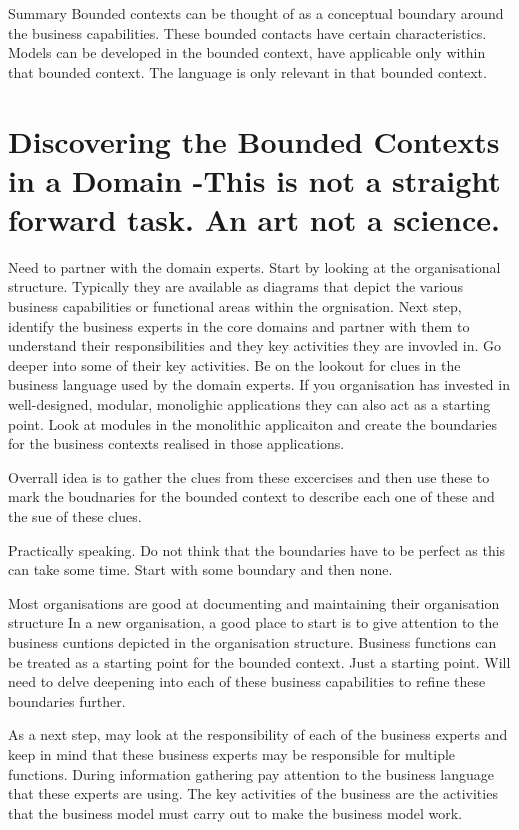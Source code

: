 Summary
Bounded contexts can be thought of as a conceptual boundary around the business capabilities.
These bounded contacts have certain characteristics.
Models can be developed in the bounded context, have applicable only within that bounded context.
The language is only relevant in that bounded context.

\section{Discovering the Bounded Contexts in a Domain -This is not a straight forward task. An art not a science.}

Need to partner with the domain experts.
Start by looking at the organisational structure.
Typically they are available as diagrams that depict the various business capabilities or functional areas within the orgnisation.
Next step, identify the business experts in the core domains and partner with them to understand their responsibilities and they key activities they are invovled in.
Go deeper into some of their key activities.
Be on the lookout for clues in the business language used by the domain experts.
If you organisation has invested in well-designed, modular, monolighic applications they can also act as a starting point.
Look at modules in the monolithic applicaiton and create the boundaries for the business contexts realised in those applications.

Overrall idea is to gather the clues from these excercises and then use these to mark the boudnaries for the bounded context to describe each one of these and the sue of these clues.

Practically speaking. Do not think that the boundaries have to be perfect as this can take some time.
Start with some boundary and then none.

Most organisations are good at documenting and maintaining their organisation structure
In a new organisation, a good place to start is to give attention to the business cuntions depicted in the organisation structure.
Business functions can be treated as a starting point for the bounded context.
Just a starting point.
Will need to delve deepening into each of these business capabilities to refine these boundaries further.

As a next step, may look at the responsibility of each of the business experts and keep in mind that these business experts may be responsible for multiple functions.
During information gathering pay attention to the business language that these experts are using.
The key activities of the business are the activities that the business model must carry out to make the business model work.

